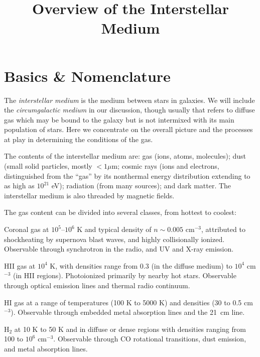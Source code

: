 \title{\bf Overview of the Interstellar Medium}

\section{Basics \& Nomenclature}

The {\it interstellar medium} is the medium between stars in
galaxies. We will include the {\it circumgalactic medium} in our
discussion, though usually that refers to diffuse gas which may be
bound to the galaxy but is not intermixed with its main population of
stars. Here we concentrate on the overall picture and the processes at
play in determining the conditions of the gas.

The contents of the interstellar medium are: gas (ions, atoms,
molecules); dust (small solid particles, mostly $< 1\mu$m; cosmic rays
(ions and electrons, distinguished from the ``gas'' by its nonthermal
energy distribution extending to as high as $10^{21}$ eV); radiation
(from many sources); and dark matter.  The interstellar medium is also
threaded by magnetic fields.

The gas content can be divided into several classes, from hottest to
coolest: 
\begin{ditemize}
\item Coronal gas at $10^{5}$--$10^6$ K and typical density of
$n \sim 0.005$ cm$^{-3}$, attributed to shockheating by supernova
blast waves, and highly collisionally ionized. Observable through
synchrotron in the radio, and UV and X-ray emission.
\item HII gas at $10^4$ K, with densities range from $0.3$
(in the diffuse medium) to $10^4$ cm$^{-3}$ (in HII regions).
Photoionized primarily by nearby hot stars. Observable through optical
emission lines and thermal radio continuum.
\item HI gas at a range of temperatures (100 K to 5000 K) and
densities (30 to 0.5 cm$^{-3}$). Observable through embedded metal
absorption lines and the 21~cm line.
\item H$_2$ at 10 K to 50 K and in diffuse or dense regions with
densities ranging from 100 to $10^6$ cm$^{-3}$. Observable through CO
rotational transitions, dust emission, and metal absorption lines.
\end{ditemize}

